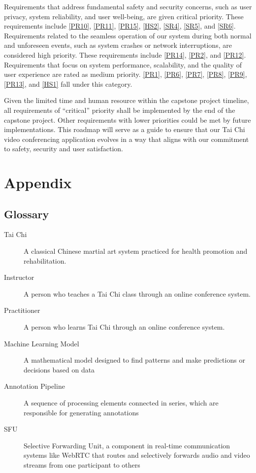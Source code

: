 \documentclass{article}
\begin{document}
Requirements that address fundamental safety and security concerns, such as user
privacy, system reliability, and user well-being, are given critical priority.
These requirements include \ref{PR10}, \ref{PR11}, \ref{PR15}, \ref{HS2},
\ref{SR4}, \ref{SR5}, and \ref{SR6}. Requirements related to the seamless
operation of our system during both normal and unforeseen events, such as system
crashes or network interruptions, are considered high priority. These
requirements include \ref{PR14}, \ref{PR2}, and \ref{PR12}. Requirements that
focus on system performance, scalability, and the quality of user experience are
rated as medium priority. \ref{PR1}, \ref{PR6}, \ref{PR7}, \ref{PR8}, \ref{PR9},
\ref{PR13}, and \ref{HS1} fall under this category.

Given the limited time and human resource within the capstone project timeline,
all requirements of ``critical'' priority shall be implemented by the end of the
capstone project. Other requirements with lower priorities could be met by
future implementations. This roadmap will serve as a guide to ensure that our
Tai Chi video conferencing application evolves in a way that aligns with our
commitment to safety, security and user satisfaction.

\section{Appendix}

\subsection{Glossary}

\begin{description}
\item[Tai Chi] A classical Chinese martial art system practiced for health
  promotion and rehabilitation.
\item[Instructor] A person who teaches a Tai Chi class through an online conference
  system.
\item[Practitioner] A person who learns Tai Chi through an online conference
  system.
\item[Machine Learning Model] A mathematical model designed to find patterns and make predictions or decisions based on data
\item[Annotation Pipeline] A sequence of processing elements connected in series, which are responsible for generating annotations
\item[SFU] Selective Forwarding Unit, a component in real-time communication systems like WebRTC that routes and selectively forwards audio and video streams from one participant to others
\end{description}
\end{document}
